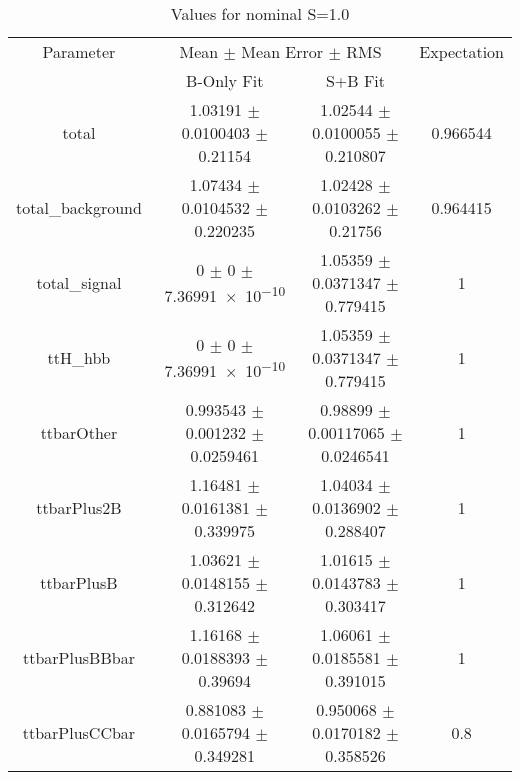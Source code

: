 \begin{table}
\centering
\caption{Values for nominal S=1.0}
\begin{tabular}{cccc}
\toprule
Parameter & \multicolumn{2}{c}{Mean $\pm$ Mean Error $\pm$ RMS} & Expectation\\
 & B-Only Fit & S+B Fit & \\
\midrule
total & \num{1.03191} $\pm$ \num{0.0100403} $\pm$ \num{0.21154} & \num{1.02544} $\pm$ \num{0.0100055} $\pm$ \num{0.210807} & \num{0.966544}\\
total\_background & \num{1.07434} $\pm$ \num{0.0104532} $\pm$ \num{0.220235} & \num{1.02428} $\pm$ \num{0.0103262} $\pm$ \num{0.21756} & \num{0.964415}\\
total\_signal & \num{0} $\pm$ \num{0} $\pm$ \num{7.36991e-10} & \num{1.05359} $\pm$ \num{0.0371347} $\pm$ \num{0.779415} & \num{1}\\
ttH\_hbb & \num{0} $\pm$ \num{0} $\pm$ \num{7.36991e-10} & \num{1.05359} $\pm$ \num{0.0371347} $\pm$ \num{0.779415} & \num{1}\\
ttbarOther & \num{0.993543} $\pm$ \num{0.001232} $\pm$ \num{0.0259461} & \num{0.98899} $\pm$ \num{0.00117065} $\pm$ \num{0.0246541} & \num{1}\\
ttbarPlus2B & \num{1.16481} $\pm$ \num{0.0161381} $\pm$ \num{0.339975} & \num{1.04034} $\pm$ \num{0.0136902} $\pm$ \num{0.288407} & \num{1}\\
ttbarPlusB & \num{1.03621} $\pm$ \num{0.0148155} $\pm$ \num{0.312642} & \num{1.01615} $\pm$ \num{0.0143783} $\pm$ \num{0.303417} & \num{1}\\
ttbarPlusBBbar & \num{1.16168} $\pm$ \num{0.0188393} $\pm$ \num{0.39694} & \num{1.06061} $\pm$ \num{0.0185581} $\pm$ \num{0.391015} & \num{1}\\
ttbarPlusCCbar & \num{0.881083} $\pm$ \num{0.0165794} $\pm$ \num{0.349281} & \num{0.950068} $\pm$ \num{0.0170182} $\pm$ \num{0.358526} & \num{0.8}\\
\bottomrule
\end{tabular}
\end{table}